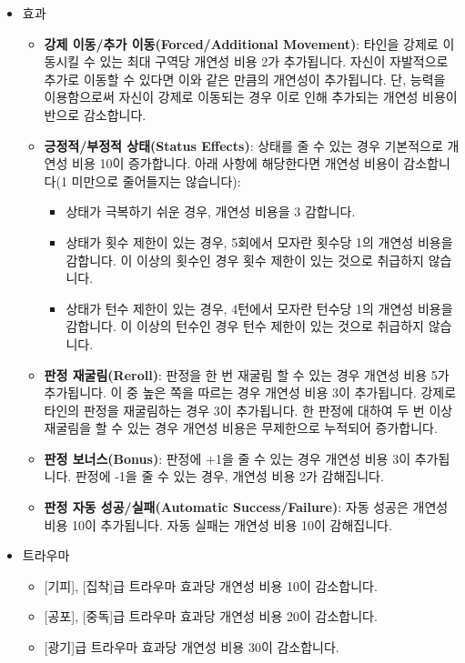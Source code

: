 \documentclass{report}
\begin{document}
\begin{itemize}
		\item 효과
		\begin{itemize}
			\item \textbf{강제 이동/추가 이동(Forced/Additional Movement)}: 타인을 강제로 이동시킬 수 있는 최대 구역당 개연성 비용 2가 추가됩니다. 자신이 자발적으로 추가로 이동할 수 있다면 이와 같은 만큼의 개연성이 추가됩니다. 단, 능력을 이용함으로써 자신이 강제로 이동되는 경우 이로 인해 추가되는 개연성 비용이 반으로 감소합니다.
			\item \textbf{긍정적/부정적 상태(Status Effects)}: 상태를 줄 수 있는 경우 기본적으로 개연성 비용 10이 증가합니다. 아래 사항에 해당한다면 개연성 비용이 감소합니다(1 미만으로 줄어들지는 않습니다):
			\begin{itemize}
				\item 상태가 극복하기 쉬운 경우, 개연성 비용을 3 감합니다.
				\item 상태가 횟수 제한이 있는 경우, 5회에서 모자란 횟수당 1의 개연성 비용을 감합니다. 이 이상의 횟수인 경우 횟수 제한이 있는 것으로 취급하지 않습니다.
				\item 상태가 턴수 제한이 있는 경우, 4턴에서 모자란 턴수당 1의 개연성 비용을 감합니다. 이 이상의 턴수인 경우 턴수 제한이 있는 것으로 취급하지 않습니다.
			\end{itemize}
			\item \textbf{판정 재굴림(Reroll)}: 판정을 한 번 재굴림 할 수 있는 경우 개연성 비용 5가 추가됩니다. 이 중 높은 쪽을 따르는 경우 개연성 비용 3이 추가됩니다. 강제로 타인의 판정을 재굴림하는 경우 3이 추가됩니다. 한 판정에 대하여 두 번 이상 재굴림을 할 수 있는 경우 개연성 비용은 무제한으로 누적되어 증가합니다.
			\item \textbf{판정 보너스(Bonus)}: 판정에 +1을 줄 수 있는 경우 개연성 비용 3이 추가됩니다. 판정에 -1을 줄 수 있는 경우, 개연성 비용 2가 감해집니다.
			\item \textbf{판정 자동 성공/실패(Automatic Success/Failure)}: 자동 성공은 개연성 비용 10이 추가됩니다. 자동 실패는 개연성 비용 10이 감해집니다.
		\end{itemize}
		
		\item 트라우마
		\begin{itemize}
			\item {}[기피], [집착]급 트라우마 효과당 개연성 비용 10이 감소합니다.
			\item {}[공포], [중독]급 트라우마 효과당 개연성 비용 20이 감소합니다.
			\item {}[광기]급 트라우마 효과당 개연성 비용 30이 감소합니다.
		\end{itemize}
	\end{itemize}
	
\end{document}

